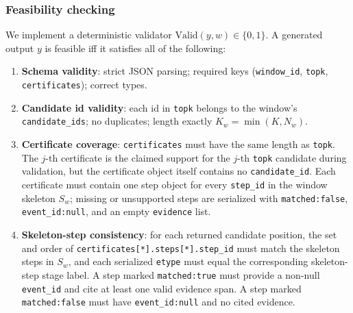 \documentclass{article}
\begin{document}
\subsubsection{Feasibility checking}
\label{sec:app_rl_validator}

We implement a deterministic validator $\mathrm{Valid}(y,w)\in\{0,1\}$.
A generated output $y$ is feasible iff it satisfies all of the following:

\begin{enumerate}
    \item \textbf{Schema validity}: strict JSON parsing; required keys (\texttt{window\_id}, \texttt{topk}, \texttt{certificates}); correct types.
    \item \textbf{Candidate id validity}: each id in \texttt{topk} belongs to the window's \texttt{candidate\_ids}; no duplicates; length exactly $K_w=\min(K,N_w)$.

    \item \textbf{Certificate coverage}: \texttt{certificates} must have the same length as \texttt{topk}. The $j$-th certificate is the claimed support for the $j$-th \texttt{topk} candidate during validation, but the certificate object itself contains no \texttt{candidate\_id}. Each certificate must contain one step object for every \texttt{step\_id} in the window skeleton $S_w$; missing or unsupported steps are serialized with \texttt{matched:false}, \texttt{event\_id:null}, and an empty \texttt{evidence} list.
    \item \textbf{Skeleton-step consistency}: for each returned candidate position, the set and order of \texttt{certificates[*].steps[*].step\_id} must match the skeleton steps in $S_w$, and each serialized \texttt{etype} must equal the corresponding skeleton-step stage label.
    A step marked \texttt{matched:true} must provide a non-null \texttt{event\_id} and cite at least one valid evidence span.
    A step marked \texttt{matched:false} must have \texttt{event\_id:null} and no cited evidence.


\end{enumerate}
\end{document}

